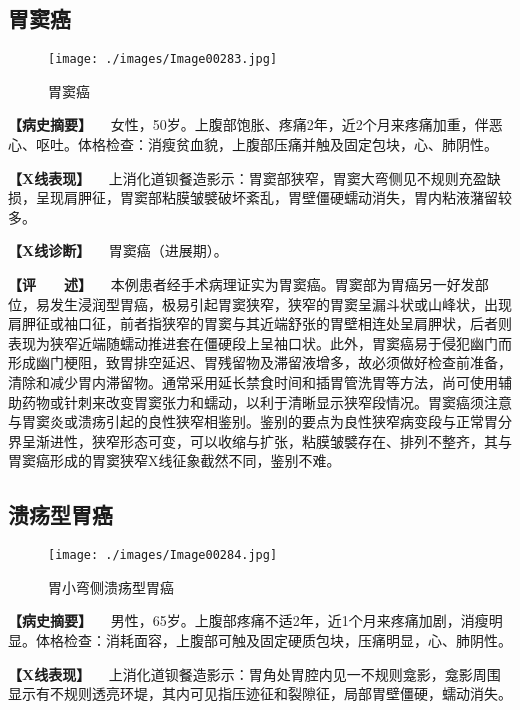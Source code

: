 \subsection{胃窦癌}

\begin{figure}[!htbp]
 \centering
 \texttt{[image: ./images/Image00283.jpg]}
 \captionsetup{justification=centering}
 \caption{胃窦癌}
 \label{fig5-3-21}
  \end{figure} 

\textbf{【病史摘要】}
　女性，50岁。上腹部饱胀、疼痛2年，近2个月来疼痛加重，伴恶心、呕吐。体格检查：消瘦贫血貌，上腹部压痛并触及固定包块，心、肺阴性。

\textbf{【X线表现】}
　上消化道钡餐造影示：胃窦部狭窄，胃窦大弯侧见不规则充盈缺损，呈现肩胛征，胃窦部粘膜皱襞破坏紊乱，胃壁僵硬蠕动消失，胃内粘液潴留较多。

\textbf{【X线诊断】} 　胃窦癌（进展期）。

\textbf{【评　　述】}
　本例患者经手术病理证实为胃窦癌。胃窦部为胃癌另一好发部位，易发生浸润型胃癌，极易引起胃窦狭窄，狭窄的胃窦呈漏斗状或山峰状，出现肩胛征或袖口征，前者指狭窄的胃窦与其近端舒张的胃壁相连处呈肩胛状，后者则表现为狭窄近端随蠕动推进套在僵硬段上呈袖口状。此外，胃窦癌易于侵犯幽门而形成幽门梗阻，致胃排空延迟、胃残留物及滞留液增多，故必须做好检查前准备，清除和减少胃内滞留物。通常采用延长禁食时间和插胃管洗胃等方法，尚可使用辅助药物或针刺来改变胃窦张力和蠕动，以利于清晰显示狭窄段情况。胃窦癌须注意与胃窦炎或溃疡引起的良性狭窄相鉴别。鉴别的要点为良性狭窄病变段与正常胃分界呈渐进性，狭窄形态可变，可以收缩与扩张，粘膜皱襞存在、排列不整齐，其与胃窦癌形成的胃窦狭窄X线征象截然不同，鉴别不难。

\subsection{溃疡型胃癌}

\begin{figure}[!htbp]
 \centering
 \texttt{[image: ./images/Image00284.jpg]}
 \captionsetup{justification=centering}
 \caption{胃小弯侧溃疡型胃癌}
 \label{fig5-3-22}
  \end{figure} 

\textbf{【病史摘要】}
　男性，65岁。上腹部疼痛不适2年，近1个月来疼痛加剧，消瘦明显。体格检查：消耗面容，上腹部可触及固定硬质包块，压痛明显，心、肺阴性。

\textbf{【X线表现】}
　上消化道钡餐造影示：胃角处胃腔内见一不规则龛影，龛影周围显示有不规则透亮环堤，其内可见指压迹征和裂隙征，局部胃壁僵硬，蠕动消失。


